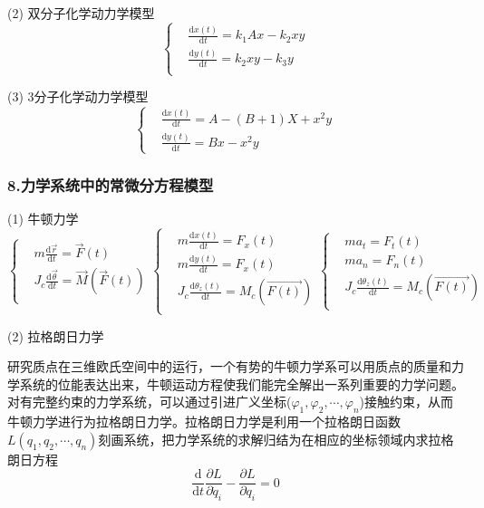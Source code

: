 (2) 双分子化学动力学模型
$$
\left\{ 
\begin{aligned}
{}&\frac{\mathrm{d}x(t)}{\mathrm{d}t} = k_1Ax-k_2xy\\
{}&\frac{\mathrm{d}y(t)}{\mathrm{d}t} = k_2xy-k_3y\\
\end{aligned}
\right. 
$$

(3) 3分子化学动力学模型
$$
\left\{ 
\begin{aligned}
{}&\frac{\mathrm{d}x(t)}{\mathrm{d}t} = A-(B+1)X+x^2y\\
{}&\frac{\mathrm{d}y(t)}{\mathrm{d}t} = Bx-x^2y
\end{aligned}
\right. 
$$

\subsubsection{8.力学系统中的常微分方程模型}

(1) 牛顿力学
$$
\left\{ 
\begin{aligned}
{}& m \frac{\mathrm{d}\vec{r}}{\mathrm{d}t}=\vec{F}(t) \\
{}& J_c \frac{\mathrm{d}\vec{\theta}}{\mathrm{d}t} =\vec{M}(\vec{F}(t))  \\
\end{aligned}
\right. 
\left\{ 
\begin{aligned}
{}&m \frac{\mathrm{d}x(t)}{\mathrm{d}t} = F_x(t)\\
{}&m \frac{\mathrm{d}y(t)}{\mathrm{d}t} = F_x(t)\\
{}&J_c \frac{\mathrm{d}\theta_z(t)}{\mathrm{d}t} = M_c(\vec{F(t)})\\
\end{aligned}
\right. 
\left\{ 
\begin{aligned}
{}&m a_t = F_t(t)\\
{}&m a_n = F_n(t)\\
{}&J_c \frac{\mathrm{d}\theta_z(t)}{\mathrm{d}t} = M_c(\vec{F(t)})\\
\end{aligned}
\right. 
$$

(2) 拉格朗日力学

研究质点在三维欧氏空间中的运行，一个有势的牛顿力学系可以用质点的质量和力学系统的位能表达出来，牛顿运动方程使我们能完全解出一系列重要的力学问题。对有完整约束的力学系统，可以通过引进广义坐标($\varphi_1,\varphi_2,\cdots,\varphi_n$)接触约束，从而牛顿力学进行为拉格朗日力学。拉格朗日力学是利用一个拉格朗日函数$L(q_1,q_2 ,\cdots,q_n)$刻画系统，把力学系统的求解归结为在相应的坐标领域内求拉格朗日方程
$$
	\frac{\mathrm{d}}{\mathrm{d}t}\frac{\partial L}{\partial \dot{q}_i} -\frac{\partial L}{\partial q _i} = 0
$$

